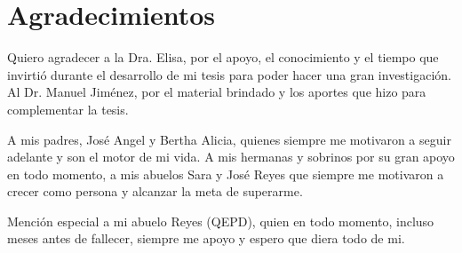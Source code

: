
\chapter{Agradecimientos}

Quiero agradecer a la Dra. Elisa, por el apoyo, el conocimiento y el tiempo que invirtió durante el desarrollo de mi tesis para poder hacer una gran investigación. Al Dr. Manuel Jiménez, por el material brindado y los aportes que hizo para complementar la tesis. 

A mis padres, José Angel y Bertha Alicia, quienes siempre me motivaron a seguir adelante y son el motor de mi vida. A mis hermanas y sobrinos por su gran apoyo en todo momento, a mis abuelos Sara y José Reyes que siempre me motivaron a crecer como persona y alcanzar la meta de superarme.

Mención especial a mi abuelo Reyes (QEPD), quien en todo momento, incluso meses antes de fallecer, siempre me apoyo y espero que diera todo de mi.

